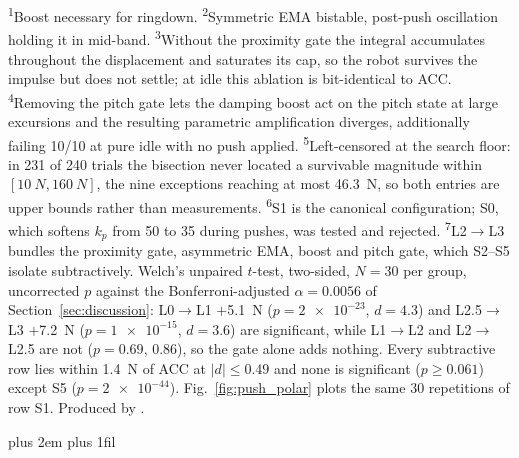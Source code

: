 \documentclass[a4paper,fleqn]{cas-dc}
\newcommand{\tabnote}{\par\leftskip=0pt\rightskip=0pt plus 2em%
  \parfillskip=0pt plus 1fil\relax}
\begin{document}
\begin{table}[pos=!tbp]
\textsuperscript{1}Boost necessary for ringdown.
\textsuperscript{2}Symmetric EMA bistable, post-push oscillation holding it in mid-band.
\textsuperscript{3}Without the proximity gate the integral accumulates throughout the displacement and saturates its cap, so the robot survives the impulse but does not settle; at idle this ablation is bit-identical to ACC.
\textsuperscript{4}Removing the pitch gate lets the damping boost act on the pitch state at large excursions and the resulting parametric amplification diverges, additionally failing \num{10}/\num{10} at pure idle with no push applied.
\textsuperscript{5}Left-censored at the search floor: in \num{231} of \num{240} trials the bisection never located a survivable magnitude within $[\SI{10}{N},\SI{160}{N}]$, the nine exceptions reaching at most \SI{46.3}{N}, so both entries are upper bounds rather than measurements.
\textsuperscript{6}S1 is the canonical configuration; S0, which softens $k_p$ from \num{50} to \num{35} during pushes, was tested and rejected. \textsuperscript{7}L2$\rightarrow$L3 bundles the proximity gate, asymmetric EMA, boost and pitch gate, which S2--S5 isolate subtractively.
Welch's unpaired $t$-test, two-sided, $N{=}30$ per group, uncorrected $p$ against the Bonferroni-adjusted $\alpha{=}0.0056$ of Section~\ref{sec:discussion}: L0$\rightarrow$L1 $+$\SI{5.1}{N} ($p{=}\num{2e-23}$, $d{=}4.3$) and L2.5$\rightarrow$L3 $+$\SI{7.2}{N} ($p{=}\num{1e-15}$, $d{=}3.6$) are significant, while L1$\rightarrow$L2 and L2$\rightarrow$L2.5 are not ($p{=}0.69$, $0.86$), so the gate alone adds nothing. Every subtractive row lies within \SI{1.4}{N} of ACC at $|d|{\le}0.49$ and none is significant ($p{\geq}0.061$) except S5 ($p{=}\num{2e-44}$). Fig.~\ref{fig:push_polar} plots the same \num{30} repetitions of row S1. Produced by .\tabnote\noindent
\end{table}
\end{document}
